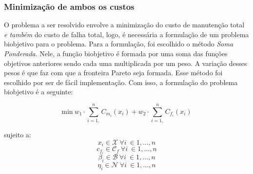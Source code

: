 \subsubsection{Minimização de ambos os custos} O problema a ser resolvido envolve a minimização do custo de manutenção total \emph{e também} do custo de falha total, logo, é necessária a formulação de um problema biobjetivo para o problema. Para a formulação, foi escolhido o método \emph{Soma Ponderada}. Nele, a função biobjetivo é formada por uma soma das funções objetivos anteriores sendo cada uma multiplicada por um peso. A variação desses pesos é que faz com que a fronteira Pareto seja formada. Esse método foi escolhido por ser de fácil implementação. Com isso, a formulação do problema biobjetivo é a seguinte:

\begin{equation}
\mathrm{min}\ w_1 \cdot \sum_{i=1,}^{n} C_{m_i} (x_i) + w_2 \cdot \sum_{i=1,}^{n} C_{f_i} (x_i) 
\label{sum_biobj}
\end{equation}

sujeito a:
\begin{equation}
x_i \in \mathcal{X}\ \forall i\ \in 1, ..., n
\label{rest1_biobj}
\end{equation}
\begin{equation}
c_{f_i} \in \mathcal{C}_{f}\ \forall i\ \in 1, ..., n
\label{rest2_biobj}
\end{equation}
\begin{equation}
\beta_{i} \in \mathcal{B}\ \forall i\ \in 1, ..., n
\label{rest3_biobj}
\end{equation}
\begin{equation}
\eta_{i} \in \mathcal{N}\ \forall i\ \in 1, ..., n
\label{rest4_biobj}
\end{equation}